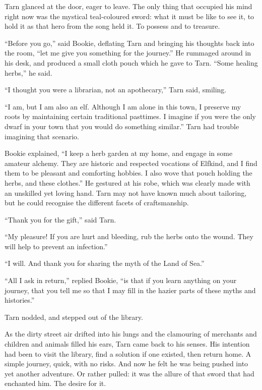 Tarn glanced at the door, eager to leave.  The only thing that occupied his mind right now was the mystical teal-coloured sword: what it must be like to see it, to hold it as that hero from the song held it.  To possess and to treasure.

``Before you go,'' said Bookie, deflating Tarn and bringing his thoughts back into the room, ``let me give you something for the journey.''  He rummaged around in his desk, and produced a small cloth pouch which he gave to Tarn.  ``Some healing herbs,'' he said.

``I thought you were a librarian, not an apothecary,'' Tarn said, smiling.

``I am, but I am also an elf.  Although I am alone in this town, I preserve my roots by maintaining certain traditional pasttimes.  I imagine if you were the only dwarf in your town that you would do something similar.''  Tarn had trouble imagining that scenario.

Bookie explained, ``I keep a herb garden at my home, and engage in some amateur alchemy.  They are historic and respected vocations of Elfkind, and I find them to be pleasant and comforting hobbies.  I also wove that pouch holding the herbs, and these clothes.''  He gestured at his robe, which was clearly made with an unskilled yet loving hand.  Tarn may not have known much about tailoring, but he could recognise the different facets of craftsmanship.

``Thank you for the gift,'' said Tarn.

``My pleasure!  If you are hurt and bleeding, rub the herbs onto the wound.  They will help to prevent an infection.''

``I will.  And thank you for sharing the myth of the Land of Sea.''

``All I ask in return,'' replied Bookie, ``is that if you learn anything on your journey, that you tell me so that I may fill in the hazier parts of these myths and histories.''

Tarn nodded, and stepped out of the library.


As the dirty street air drifted into his lungs and the clamouring of merchants and children and animals filled his ears, Tarn came back to his senses.  His intention had been to visit the library, find a solution if one existed, then return home.  A simple journey, quick, with no risks.  And now he felt he was being pushed into yet another adventure.  Or rather pulled: it was the allure of that sword that had enchanted him.  The desire for it.

